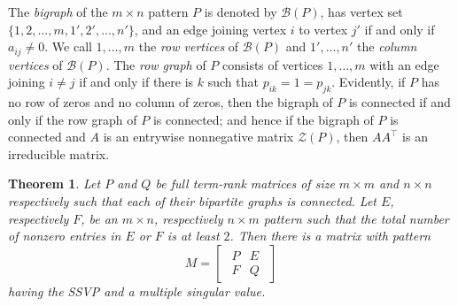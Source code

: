 \documentclass[preprint,12pt]{elsarticle}
\newcommand{\trans  }{^\top}
\newtheorem{theorem}{Theorem}[section]
\begin{document}
The {\it bigraph} of the $m\times n$ pattern $P$ is  denoted by 
$\mathcal{B}(P)$, has vertex set $\{1,2,\ldots, m,1',2', \ldots, n'\}$, and an edge joining vertex $i$ to vertex $j'$ if and only if $a_{ij}\neq 0$. We call $1, \ldots, m$
the \textit{row vertices} of $\mathcal{B}(P)$ 
and $1', \ldots, n'$ the \textit{column vertices} of $\mathcal{B}(P)$. The \textit{row graph} of $P$
consists of vertices $1, \ldots, m$ with an 
edge joining $i\neq j$ if and only if there is $k$ such that $p_{ik}=1=p_{jk}$.  Evidently, if $P$ has 
no row of zeros and no column of zeros, then the bigraph of $P$ is connected if and only if the 
row graph of $P$ is connected; and hence if the bigraph of $P$ is connected and $A$ is 
an entrywise nonnegative matrix  $\mathcal{Z}(P)$, 
then $AA\trans$ is an irreducible matrix. 


\begin{theorem}
\label{sumplus}
Let $P$ and $Q$ be full term-rank matrices
of size $m\times m$ and $n\times n$ respectively 
such that 
each of their bipartite graphs is connected.
  Let $E$, respectively $F$, be an $m\times n$, 
respectively $n\times m$  pattern 
such that the total number of nonzero entries in $E$ or $F$ is at least $2$. 
Then there is a matrix with pattern 
\begin{equation}
\label{patt}
M=\begin{bmatrix}
\begin{array}{c|c}
P & E\\ \hline
F & Q
\end{array}
\end{bmatrix}
\end{equation}
having the SSVP and a multiple singular value. 
\end{theorem}
\end{document}
